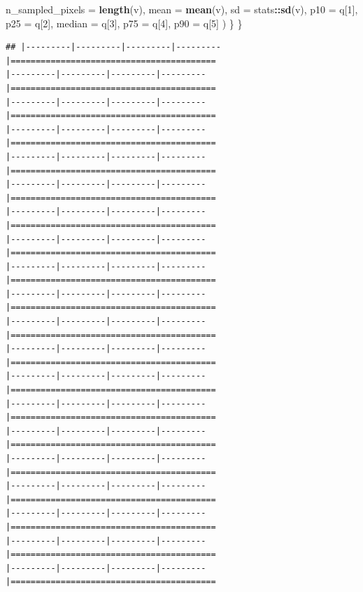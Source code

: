 \documentclass[
]{article}
\newenvironment{Shaded}{\begin{snugshade}}{\end{snugshade}}
\newcommand{\AttributeTok}[1]{\textcolor[rgb]{0.13,0.29,0.53}{#1}}
\newcommand{\DecValTok}[1]{\textcolor[rgb]{0.00,0.00,0.81}{#1}}
\newcommand{\FunctionTok}[1]{\textcolor[rgb]{0.13,0.29,0.53}{\textbf{#1}}}
\newcommand{\NormalTok}[1]{#1}
\newcommand{\SpecialCharTok}[1]{\textcolor[rgb]{0.81,0.36,0.00}{\textbf{#1}}}
\begin{document}
\begin{Shaded}
\begin{Highlighting}[]
      \AttributeTok{n\_sampled\_pixels =} \FunctionTok{length}\NormalTok{(v), }\AttributeTok{mean =} \FunctionTok{mean}\NormalTok{(v), }\AttributeTok{sd =}\NormalTok{ stats}\SpecialCharTok{::}\FunctionTok{sd}\NormalTok{(v),}
      \AttributeTok{p10 =}\NormalTok{ q[}\DecValTok{1}\NormalTok{], }\AttributeTok{p25 =}\NormalTok{ q[}\DecValTok{2}\NormalTok{], }\AttributeTok{median =}\NormalTok{ q[}\DecValTok{3}\NormalTok{], }\AttributeTok{p75 =}\NormalTok{ q[}\DecValTok{4}\NormalTok{], }\AttributeTok{p90 =}\NormalTok{ q[}\DecValTok{5}\NormalTok{]}
\NormalTok{    )}
\NormalTok{  \}}
\NormalTok{\}}
\end{Highlighting}
\end{Shaded}

\begin{verbatim}
## |---------|---------|---------|---------|=========================================                                          |---------|---------|---------|---------|=========================================                                          |---------|---------|---------|---------|=========================================                                          |---------|---------|---------|---------|=========================================                                          |---------|---------|---------|---------|=========================================                                          |---------|---------|---------|---------|=========================================                                          |---------|---------|---------|---------|=========================================                                          |---------|---------|---------|---------|=========================================                                          |---------|---------|---------|---------|=========================================                                          |---------|---------|---------|---------|=========================================                                          |---------|---------|---------|---------|=========================================                                          |---------|---------|---------|---------|=========================================                                          |---------|---------|---------|---------|=========================================                                          |---------|---------|---------|---------|=========================================                                          |---------|---------|---------|---------|=========================================                                          |---------|---------|---------|---------|=========================================                                          |---------|---------|---------|---------|=========================================                                          |---------|---------|---------|---------|=========================================                                          |---------|---------|---------|---------|=========================================                                          |---------|---------|---------|---------|========================================= 
\end{verbatim}
\end{document}
